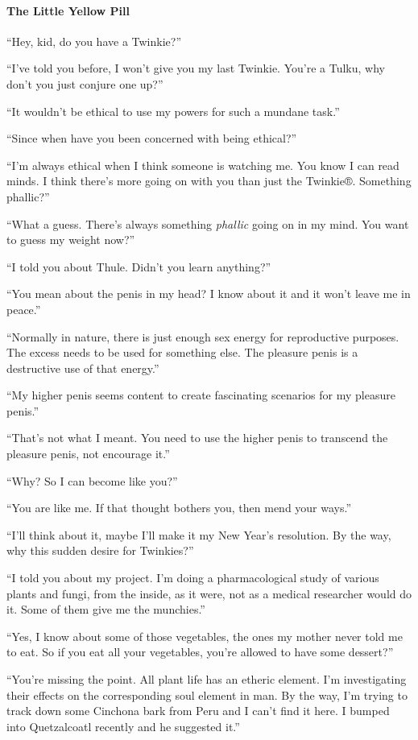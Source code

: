 \paragraph{The Little Yellow Pill}

``Hey, kid, do you have a Twinkie?''

``I've told you before, I won't give you my last Twinkie. You're a Tulku, why don't you just conjure one up?''

``It wouldn't be ethical to use my powers for such a mundane task.''

``Since when have you been concerned with being ethical?''

``I'm always ethical when I think someone is watching me. You know I can read minds. I think there's more going on with you than just the Twinkie®. Something phallic?''

``What a guess. There's always something \emph{phallic} going on in my mind. You want to guess my weight now?''

``I told you about Thule. Didn't you learn anything?''

``You mean about the penis in my head? I know about it and it won't leave me in peace.''

``Normally in nature, there is just enough sex energy for reproductive purposes. The excess needs to be used for something else. The pleasure penis is a destructive use of that energy.''

``My higher penis seems content to create fascinating scenarios for my pleasure penis.''

``That's not what I meant. You need to use the higher penis to transcend the pleasure penis, not encourage it.''

``Why? So I can become like you?''

``You are like me. If that thought bothers you, then mend your ways.''

``I'll think about it, maybe I'll make it my New Year's resolution. By the way, why this sudden desire for Twinkies?''

``I told you about my project. I'm doing a pharmacological study of various plants and fungi, from the inside, as it were, not as a medical researcher would do it. Some of them give me the munchies.''

``Yes, I know about some of those vegetables, the ones my mother never told me to eat. So if you eat all your vegetables, you're allowed to have some dessert?''

``You're missing the point. All plant life has an etheric element. I'm investigating their effects on the corresponding soul element in man. By the way, I'm trying to track down some Cinchona bark from Peru and I can't find it here. I bumped into Quetzalcoatl recently and he suggested it.''

